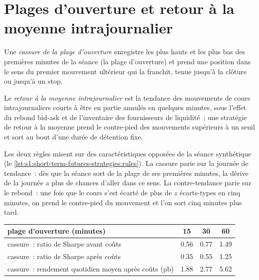 \section{Plages d'ouverture et retour à la moyenne intrajournalier}

\begin{definition}\label{def:s1:short-term-futures-strategies:orb}
Une \emph{cassure de la plage d'ouverture} enregistre les plus hauts et les plus bas des premières minutes de la séance (la
plage d'ouverture) et prend une position dans le sens du premier mouvement ultérieur qui la franchit, tenue jusqu'à la clôture ou jusqu'à un stop.
\end{definition}

\begin{definition}\label{def:s1:short-term-futures-strategies:mr}
Le \emph{retour à la moyenne intrajournalier} est la tendance des mouvements de cours intrajournaliers courts à être en partie annulés en quelques minutes, sous l'effet
du rebond bid-ask et de l'inventaire des fournisseurs de liquidité~; une stratégie de retour à la moyenne prend le contre-pied des mouvements supérieurs à un seuil et sort au bout d'une durée de détention fixe.
\end{definition}

Les deux règles misent sur des caractéristiques opposées de la séance synthétique (le \cref{lst:s1:short-term-futures-strategies:rules}). La cassure parie sur la journée de tendance~:
dès que la séance sort de la plage de ses premières minutes, la dérive de la journée a plus de chances d'aller dans ce sens. La contre-tendance parie sur le rebond~: une fois que
le cours s'est écarté de plus de $z$ écarts-types en cinq minutes, on prend le contre-pied du mouvement et l'on sort cinq minutes plus tard.

\begin{center}
\small
\begin{tabular}{@{}p{7.0cm}ccc@{}}
\toprule
plage d'ouverture (minutes) & 15 & 30 & 60\\
\midrule
cassure~: ratio de Sharpe avant coûts & 0.56 & 0.77 & 1.49\\
cassure~: ratio de Sharpe après coûts & 0.35 & 0.55 & 1.25\\
cassure~: rendement quotidien moyen après coûts (pb) & 1.88 & 2.77 & 5.62\\
\bottomrule
\end{tabular}
\end{center}

